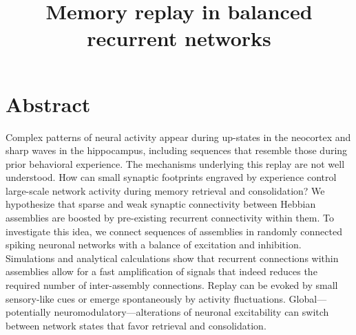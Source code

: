 \documentclass[openright,11pt%
]{scrbook}[2007/12/24]
\begin{document}
\title{Memory replay in balanced recurrent networks}

\maketitle
\newpage

\section*{Abstract}

Complex patterns of neural activity appear during up-states in the neocortex and sharp waves in the hippocampus, including sequences that resemble those during prior behavioral experience. The mechanisms underlying this replay are not well understood. How can small synaptic footprints engraved by experience control large-scale network activity during memory retrieval and consolidation? We hypothesize that sparse and weak synaptic connectivity between Hebbian assemblies are boosted by pre-existing recurrent connectivity within them. To investigate this idea, we connect sequences of assemblies in randomly connected spiking neuronal networks with a balance of excitation and inhibition. Simulations and analytical calculations show that recurrent connections within assemblies allow for a fast amplification of signals that indeed reduces the required number of inter-assembly connections. Replay can be evoked by small sensory-like cues or emerge spontaneously by activity fluctuations. Global---potentially neuromodulatory---alterations of neuronal excitability can switch between network states that favor retrieval and consolidation.

\newpage

\tableofcontents

%

%



\end{document}
